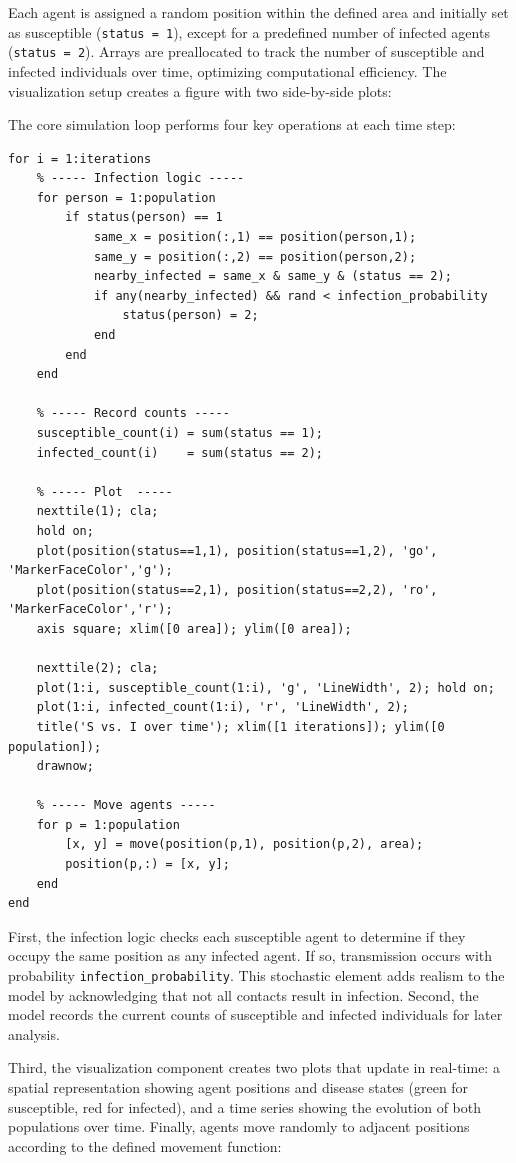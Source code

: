 \documentclass{article}
\begin{document}
Each agent is assigned a random position within the defined area and initially set as susceptible (\texttt{status = 1}), except for a predefined number of infected agents (\texttt{status = 2}). Arrays are preallocated to track the number of susceptible and infected individuals over time, optimizing computational efficiency.
The visualization setup creates a figure with two side-by-side plots:

The core simulation loop performs four key operations at each time step:

\begin{lstlisting}[caption={Simulation loop}]
for i = 1:iterations
    % ----- Infection logic -----
    for person = 1:population
        if status(person) == 1
            same_x = position(:,1) == position(person,1);
            same_y = position(:,2) == position(person,2);
            nearby_infected = same_x & same_y & (status == 2);
            if any(nearby_infected) && rand < infection_probability
                status(person) = 2;
            end
        end
    end

    % ----- Record counts -----
    susceptible_count(i) = sum(status == 1);
    infected_count(i)    = sum(status == 2);

    % ----- Plot  -----
    nexttile(1); cla;
    hold on;
    plot(position(status==1,1), position(status==1,2), 'go', 'MarkerFaceColor','g');
    plot(position(status==2,1), position(status==2,2), 'ro', 'MarkerFaceColor','r');
    axis square; xlim([0 area]); ylim([0 area]);

    nexttile(2); cla;
    plot(1:i, susceptible_count(1:i), 'g', 'LineWidth', 2); hold on;
    plot(1:i, infected_count(1:i), 'r', 'LineWidth', 2);
    title('S vs. I over time'); xlim([1 iterations]); ylim([0 population]);
    drawnow;

    % ----- Move agents -----
    for p = 1:population
        [x, y] = move(position(p,1), position(p,2), area);
        position(p,:) = [x, y];
    end
end
\end{lstlisting}

First, the infection logic checks each susceptible agent to determine if they occupy the same position as any infected agent. If so, transmission occurs with probability \texttt{infection\_probability}. This stochastic element adds realism to the model by acknowledging that not all contacts result in infection. Second, the model records the current counts of susceptible and infected individuals for later analysis.

Third, the visualization component creates two plots that update in real-time: a spatial representation showing agent positions and disease states (green for susceptible, red for infected), and a time series showing the evolution of both populations over time.
Finally, agents move randomly to adjacent positions according to the defined movement function:
\end{document}
